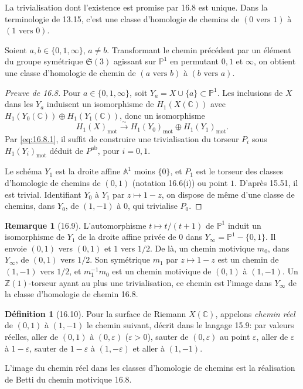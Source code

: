 \documentclass[12pt,a4paper]{article}
\theoremstyle{plain}
\theoremstyle{definition}
\newtheorem{definition}[theorem]{Définition}
\newtheorem{remark}[theorem]{Remarque}
\theoremstyle{remark}
\newcommand{\bZ}{\mathbb{Z}}
\newcommand{\bC}{\mathbb{C}}
\newcommand{\bP}{\mathbb{P}}
\newcommand{\bA}{\mathbb{A}}
\newcommand{\mot}{\mathrm{mot}}
\begin{document}
La trivialisation dont l'existence est promise par 16.8 est unique. Dans la terminologie de 13.15, c'est une classe d'homologie de chemins de $(0 \text{ vers } 1)$ à $(1 \text{ vers } 0)$.

Soient $a, b \in \{0, 1, \infty\}$, $a \neq b$. Transformant le chemin précédent par un élément du groupe symétrique $\mathfrak{S}(3)$ agissant sur $\bP^1$ en permutant $0, 1$ et $\infty$, on obtient une classe d'homologie de chemin de $(a \text{ vers } b)$ à $(b \text{ vers } a)$.

\begin{proof}[Preuve de 16.8]
Pour $a \in \{0, 1, \infty\}$, soit $Y_a = X \cup \{a\} \subset \bP^1$. Les inclusions de $X$ dans les $Y_a$ induisent un isomorphisme de $H_1(X(\bC))$ avec $H_1(Y_0(\bC)) \oplus H_1(Y_1(\bC))$, donc un isomorphisme
\begin{equation}\label{eq:16.8.1}
H_1(X)_{\mot} \xrightarrow{\sim} H_1(Y_0)_{\mot} \oplus H_1(Y_1)_{\mot}.
\end{equation}
Par \eqref{eq:16.8.1}, il suffit de construire une trivialisation du torseur $P_i$ sous $H_1(Y_i)_{\mot}$ déduit de $P^{\text{ab}}$, pour $i = 0, 1$.

Le schéma $Y_1$ est la droite affine $\bA^1$ moins $\{0\}$, et $P_1$ est le torseur des classes d'homologie de chemins de $(0, 1)$ (notation 16.6(i)) ou point $1$. D'après 15.51, il est trivial. Identifiant $Y_0$ à $Y_1$ par $z \mapsto 1 - z$, on dispose de même d'une classe de chemins, dans $Y_0$, de $(1, -1)$ à $0$, qui trivialise $P_0$.
\end{proof}

\begin{remark}[16.9]
L'automorphisme $t \mapsto t/(t+1)$ de $\bP^1$ induit un isomorphisme de $Y_1$ de la droite affine privée de $0$ dans $Y_{\infty} = \bP^1 - \{0, 1\}$. Il envoie $(0, 1)$ vers $(0, 1)$ et $1$ vers $1/2$. De là, un chemin motivique $m_0$, dans $Y_{\infty}$, de $(0, 1)$ vers $1/2$. Son symétrique $m_1$ par $z \mapsto 1 - z$ est un chemin de $(1, -1)$ vers $1/2$, et $m_1^{-1} m_0$ est un chemin motivique de $(0, 1)$ à $(1, -1)$. Un $\bZ(1)$-torseur ayant au plus une trivialisation, ce chemin est l'image dans $Y_{\infty}$ de la classe d'homologie de chemin 16.8.
\end{remark}

\begin{definition}[16.10]
Pour la surface de Riemann $X(\bC)$, appelons \emph{chemin réel} de $(0, 1)$ à $(1, -1)$ le chemin suivant, décrit dans le langage 15.9: par valeurs réelles, aller de $(0, 1)$ à $(0, \varepsilon)$ ($\varepsilon > 0$), sauter de $(0, \varepsilon)$ au point $\varepsilon$, aller de $\varepsilon$ à $1 - \varepsilon$, sauter de $1 - \varepsilon$ à $(1, -\varepsilon)$ et aller à $(1, -1)$.
\end{definition}

L'image du chemin réel dans les classes d'homologie de chemins est la réalisation de Betti du chemin motivique 16.8.
\end{document}
